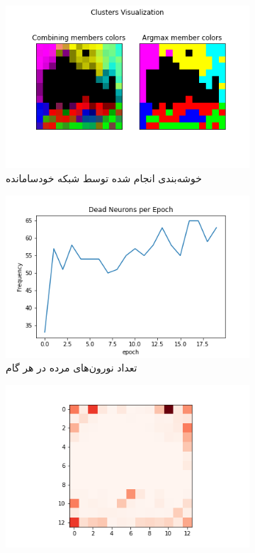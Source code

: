 \documentclass[12pt, a4paper]{article}
\begin{document}
\clearpage

\begin{figure}[h]
    \begin{subfigure}{\linewidth}
        \centering
        \includegraphics[width=0.8\linewidth]{images/q5/r18/cluster.png}
        \caption{خوشه‌بندی انجام شده توسط شبکه خودسامانده}
    \end{subfigure}
    \newline
    \begin{subfigure}{0.45\linewidth}
        \includegraphics[width=\linewidth]{images/q5/r18/dead.png}
        \caption{تعداد نورون‌های مرده در هر گام}
    \end{subfigure}
    \hfill
    \begin{subfigure}{0.45\linewidth}
        \includegraphics[width=\linewidth]{images/q5/r18/umatrix.png}

\end{subfigure}
\end{figure}
\end{document}
